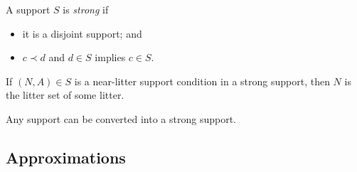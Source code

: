 \documentclass{article}
\begin{document}
\begin{definition}
    A support \( S \) is \emph{strong} if
    \begin{itemize}
        \item it is a disjoint support; and
        \item \( c \prec d \) and \( d \in S \) implies \( c \in S \).
    \end{itemize}
\end{definition}
\begin{lemma}
    If \( (N, A) \in S \) is a near-litter support condition in a strong support, then \( N \) is the litter set of some litter.
\end{lemma}
\begin{lemma}
    Any support can be converted into a strong support.
\end{lemma}

\subsection{Approximations}
\end{document}
